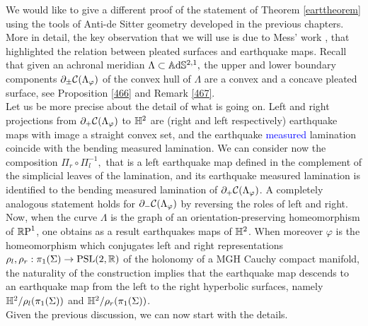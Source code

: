 We would like to give a different proof of the statement of Theorem \ref{earttheorem} using the tools of Anti-de Sitter geometry developed in the previous chapters. More in detail, the key observation that we will use is due to Mess' work \cite{Mess}, that highlighted the relation between pleated surfaces and earthquake maps. Recall that given an achronal meridian $\Lambda\subset\A^{2,1},$ the upper and lower boundary components $\partial_{\pm}\CF$ of the convex hull of $\Lambda$ are a convex and a concave pleated surface, see Proposition \ref{466} and Remark \ref{467}.\\
Let us be more precise about the detail of what is going on. Left and right projections from $\partial_+\CF$ to $\H^2$ are (right and left respectively) earthquake maps with image a straight convex set, and the earthquake \textcolor{blue}{measured} lamination coincide with the bending measured lamination. We can consider now the composition $\Pi_r\circ\Pi_l^{-1},$ that is a left earthquake map defined in the complement of the simplicial leaves of the lamination, and its earthquake measured lamination is identified to the bending measured lamination of $\partial_{+}\CF$. A completely analogous statement holds for $\partial_{-}\CF$ by reversing the roles of left and right.\\  
Now, when the curve $\Lambda$ is the graph of an orientation-preserving homeomorphism of $\S$, one obtains as a result earthquakes maps of $\H^2$. When moreover $\varphi$ is the homeomorphism which conjugates left and right representations $\rho_l,\rho_r:\pi_1(\Sigma)\to\PSL$ of the holonomy of a MGH Cauchy compact manifold, the naturality of the construction implies that the earthquake map descends to an earthquake map from the left to the right hyperbolic surfaces, namely $\H^2/\rho_l(\pi_1(\Sigma))$ and $\H^2/\rho_r(\pi_1(\Sigma))$.\\
Given the previous discussion, we can now start with the details.


